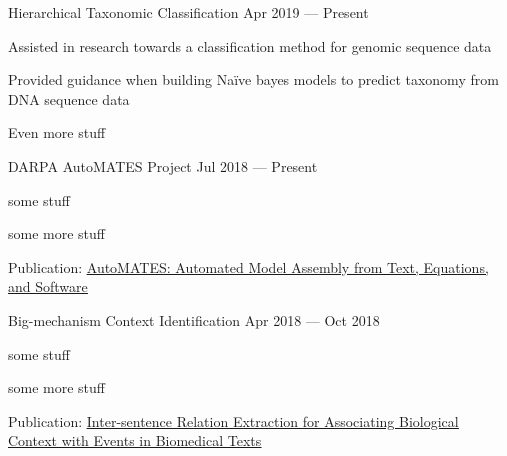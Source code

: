 \vspace{-0.5cm}

\begin{cventries}

  \cventry
    {} %
    {Hierarchical Taxonomic Classification} %
    {Apr 2019 --- Present} %
    {} %
    {
      \vspace{-0.5cm}
      \begin{cvitems} %
        \item Assisted in research towards a classification method for genomic sequence data
        \item Provided guidance when building Naïve bayes models to predict taxonomy from DNA sequence data
        \item Even more stuff
      \end{cvitems}
    }

  \cventry
    {} %
    {DARPA AutoMATES Project} %
    {Jul 2018 --- Present} %
    {} %
    {
      \vspace{-0.5cm}
      \begin{cvitems} %
        \item some stuff
        \item some more stuff
        \item Publication: \href{https://arxiv.org/abs/2001.07295}{\underline{AutoMATES: Automated Model Assembly from Text, Equations, and Software}}
      \end{cvitems}
    }

  \cventry
    {} %
    {Big-mechanism Context Identification} %
    {Apr 2018 --- Oct 2018} %
    {} %
    {
      \vspace{-0.5cm}
      \begin{cvitems} %
        \item some stuff
        \item some more stuff
        \item Publication: \href{https://arxiv.org/abs/1812.06199}{\underline{Inter-sentence Relation Extraction for Associating Biological Context with Events in Biomedical Texts}}
      \end{cvitems}
    }


\end{cventries}
